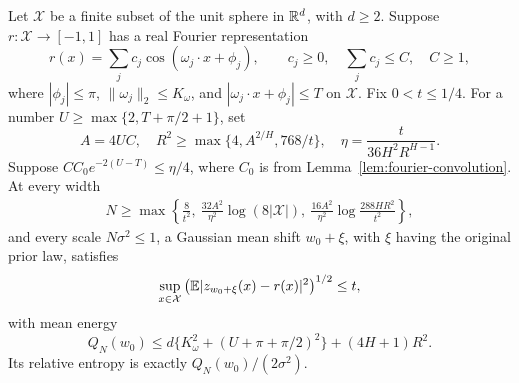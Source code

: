 \begin{lemma}
\label{lem:fourier-native}
Let $\mathcal X$ be a finite subset of the unit sphere in $\mathbb R^d$, with $d\ge2$. Suppose $r:\mathcal X\to[-1,1]$ has a real Fourier representation
\[
 r(x)=\sum_j c_j\cos(\omega_j\cdot x+\phi_j),\qquad
 c_j\ge0,\quad \sum_jc_j\le C,\quad C\ge1,
\]
where $|\phi_j|\le\pi$, $\|\omega_j\|_2\le K_\omega$, and
$|\omega_j\cdot x+\phi_j|\le T$ on $\mathcal X$. Fix $0<t\le1/4$. For a number $U\ge\max\{2,T+\pi/2+1\}$, set
\[
 A=4UC,\quad R^2\ge\max\{4,A^{2/H},768/t\},\quad
 \eta=\frac{t}{36H^2R^{H-1}}.
\]
Suppose $CC_0e^{-2(U-T)}\le\eta/4$, where $C_0$ is from Lemma~\ref{lem:fourier-convolution}. At every width
\begin{align*}
 N\ge\max\left\{\frac8{t^2},\ 
 \frac{32A^2}{\eta^2}\log(8|\mathcal X|),\ 
 \frac{16A^2}{\eta^2}\log\frac{288HR^2}{t^2}\right\},
\end{align*}
and every scale $N\sigma^2\le1$, a Gaussian mean shift $w_0+\xi$, with $\xi$ having the original prior law, satisfies
\[
 \sup_{x\in\mathcal X}\left(\mathbb E|z_{w_0+\xi}(x)-r(x)|^2\right)^{1/2}\le t,
\]
with mean energy
\[
 Q_N(w_0)\le d\{K_\omega^2+(U+\pi+\pi/2)^2\}+(4H+1)R^2.
\]
Its relative entropy is exactly $Q_N(w_0)/(2\sigma^2)$.
\end{lemma}
